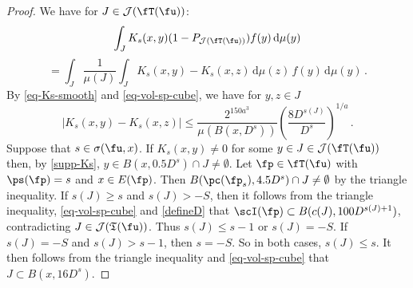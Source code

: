 \begin{proof}
    We have for $J \in \mathcal{J}(\fT(\fu))$:
    $$
        \int_J K_{s}(x,y)(1 - P_{\mathcal{J}(\fT(\fu))})f(y) \, \mathrm{d}\mu(y)
    $$
    \begin{equation}
    \label{eq-canc-comp}
        = \int_J \frac{1}{\mu(J)} \int_J K_s(x,y) - K_s(x,z) \, \mathrm{d}\mu(z) \,f(y) \, \mathrm{d}\mu(y)\,.
    \end{equation}
    By \eqref{eq-Ks-smooth} and \eqref{eq-vol-sp-cube}, we have for $y, z \in J$
    $$
        |K_s(x,y) - K_s(x,z)| \le \frac{2^{150a^3}}{\mu(B(x, D^s))} \left(\frac{8 D^{s(J)}}{D^s}\right)^{1/a}\,.
    $$
    Suppose that $s \in \sigma(\fu, x)$.
    If $K_s(x,y) \ne 0$ for some $y \in J \in \mathcal{J}(\fT(\fu))$ then, by \eqref{supp-Ks}, $y \in B(x, 0.5 D^s) \cap J \ne \emptyset$. Let $\fp \in \fT(\fu)$ with $\ps(\fp) = s$ and $x \in E(\fp)$. Then $B(\pc(\fp_s), 4.5D^s) \cap J \ne \emptyset$ by the triangle inequality. If $s(J) \ge s$ and $s(J) > -S$, then it follows from the triangle inequality, \eqref{eq-vol-sp-cube} and \eqref{defineD} that $\scI(\fp) \subset B(c(J), 100 D^{s(J)+1})$, contradicting $J \in \mathcal{J}(\mathfrak{T}(\fu))$. Thus $s(J) \le s - 1$ or $s(J) = -S$. If $s(J) = -S$ and $s(J) > s - 1$, then $s = -S$. So in both cases, $s(J) \le s$. It then follows from the triangle inequality and \eqref{eq-vol-sp-cube} that $J \subset B(x, 16 D^s)$.


\end{proof}
